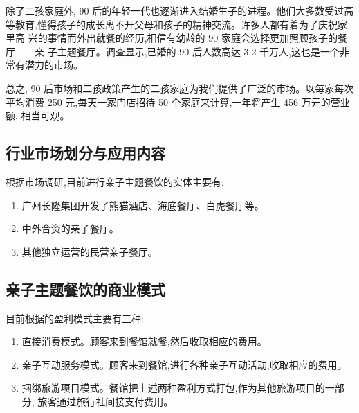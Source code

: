 除了二孩家庭外, 90 后的年轻一代也逐渐进入结婚生子的进程。他们大多数受过高
等教育,懂得孩子的成长离不开父母和孩子的精神交流。许多人都有着为了庆祝家里高
兴的事情而外出就餐的经历,相信有幼龄的 90 家庭会选择更加照顾孩子的餐厅——亲
子主题餐厅。调查显示,已婚的 90 后人数高达 3.2 千万人,这也是一个非常有潜力的市场。

总之, 90 后市场和二孩政策产生的二孩家庭为我们提供了广泛的市场。以每家每次
平均消费 250 元,每天一家门店招待 50 个家庭来计算,一年将产生 456 万元的营业额,
相当可观。

\subsection{行业市场划分与应用内容}
根据市场调研,目前进行亲子主题餐饮的实体主要有:
\begin{enumerate}[(1)]
        \item 广州长隆集团开发了熊猫酒店、海底餐厅、白虎餐厅等。
        \item 中外合资的亲子餐厅。
        \item 其他独立运营的民营亲子餐厅。
\end{enumerate}

\subsection{亲子主题餐饮的商业模式}
目前根据的盈利模式主要有三种:
\begin{enumerate}[(1)]
        \item 直接消费模式。顾客来到餐馆就餐,然后收取相应的费用。
        \item 亲子互动服务模式。顾客来到餐馆,进行各种亲子互动活动,收取相应的费用。
        \item 捆绑旅游项目模式。餐馆把上述两种盈利方式打包,作为其他旅游项目的一部分, 旅客通过旅行社间接支付费用。
\end{enumerate}

